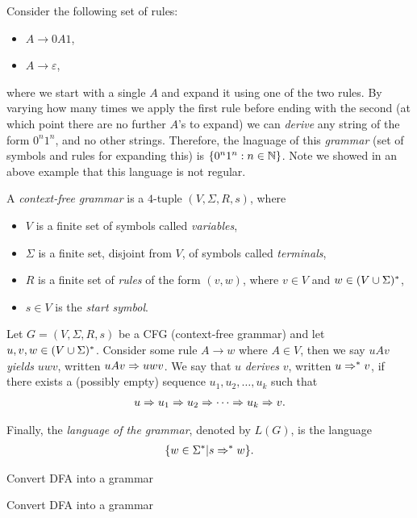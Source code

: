 Consider the following set of rules:
\begin{itemize}
    \item $A \to 0A1$,
    \item $A \to \varepsilon$,
\end{itemize}
where we start with a single $A$ and expand it using one of the two rules. By varying how many times we apply the first rule before ending with the second (at which point there are no further $A$'s to expand) we can \emph{derive} any string of the form $0^{n}1^{n}$, and no other strings. Therefore, the lnaguage of this \emph{grammar} (set of symbols and rules for expanding this) is $\{0^{n}1^{n}: n \in \mathbb{N}\}$. Note we showed in an above example that this language is not regular.

\begin{defn}
    A \emph{context-free grammar} is a $4$-tuple $(V, \Sigma, R, s)$, where
    \begin{itemize}
        \item $V$ is a finite set of symbols called \emph{variables},
        \item $\Sigma$ is a finite set, disjoint from $V$, of symbols called \emph{terminals},
        \item $R$ is a finite set of \emph{rules} of the form $(v, w)$, where $v \in V$ and $w \in (V \cup \Sigma)^{*}$,
        \item $s \in V$ is the \emph{start symbol}.
    \end{itemize}
    Let $G = (V, \Sigma, R, s)$ be a CFG (context-free grammar) and let $u, v, w \in (V \cup \Sigma)^{*}$. Consider some rule $A \to w$ where $A \in V$, then we say $uAv$ \emph{yields} $uwv$, written $uAv \Rightarrow uwv$. We say that $u$ \emph{derives} $v$, written $u \Rightarrow^{*} v$, if there exists a (possibly empty) sequence $u_1, u_2, \ldots, u_k$ such that
    \begin{align*}
        u \Rightarrow u_1 \Rightarrow u_2 \Rightarrow \cdots \Rightarrow u_k  \Rightarrow v.
    \end{align*}
    
    Finally, the \emph{language of the grammar}, denoted by $L(G)$, is the language
    \begin{align*}
        \{w \in \Sigma^{*} | s \Rightarrow^{*} w\}.
    \end{align*}
\end{defn}

\begin{thm}
    Convert DFA into a grammar
\end{thm}

\begin{exmp}
    Convert DFA into a grammar
\end{exmp}
